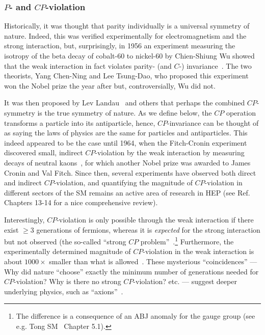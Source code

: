 \subsubsection{$P$- and $CP$-violation}

Historically, it was thought that parity individually is a universal symmetry of nature.
Indeed, this was verified experimentally for electromagnetism and the strong interaction, but, surprisingly, in 1956 an experiment measuring the isotropy of the beta decay of cobalt-60 to nickel-60 by Chien-Shiung Wu showed that the weak interaction in fact violates parity- (and $C$-) invariance~\cite{Wu:1957my}.
The two theorists, Yang Chen-Ning and Lee Tsung-Dao, who proposed this experiment won the Nobel prize the year after but, controversially, Wu did not.

It was then proposed by Lev Landau~\cite{Landau:1957tp} and others that perhaps the combined $CP$-symmetry
is the true symmetry of nature.
As we define below, the $CP$ operation transforms a particle into its antiparticle, hence, $CP$-invariance can be thought of as saying the laws of physics are the same for particles and antiparticles.
This indeed appeared to be the case until 1964, when the Fitch-Cronin experiment discovered small, indirect $CP$-violation by the weak interaction by measuring decays of neutral kaons~\cite{Christenson:1964fg}, for which another Nobel prize was awarded to James Cronin and Val Fitch.
Since then, several experiments have observed both direct and indirect $CP$-violation, and quantifying the magnitude of $CP$-violation in different sectors of the SM remains an active area of research in HEP (see Ref.~\cite{ParticleDataGroup:2024cfk} Chapters 13-14 for a nice comprehensive review).

Interestingly, $CP$-violation is only possible through the weak interaction if there exist $\geq 3$ generations of fermions, whereas it is \textit{expected} for the strong interaction but not observed (the so-called ``strong $CP$ problem''~\cite{Wu:1991rw,Mannel:2007zz}.\footnote{The difference is a consequence of an ABJ anomaly for the \SU[2] gauge group (see e.g. Tong SM~\cite{TongSM} Chapter 5.1).}
Furthermore, the experimentally determined magnitude of $CP$-violation in the weak interaction is about $1000\times$ smaller than what is allowed~\cite{Mannel:2007zz, ParticleDataGroup:2024cfk}.
These mysterious ``coincidences'' --- Why did nature ``choose'' exactly the minimum number of generations needed for $CP$-violation? Why is there no strong $CP$-violation? etc. --- suggest deeper underlying physics, such as ``axions''~\cite{Dine:1981rt}.


